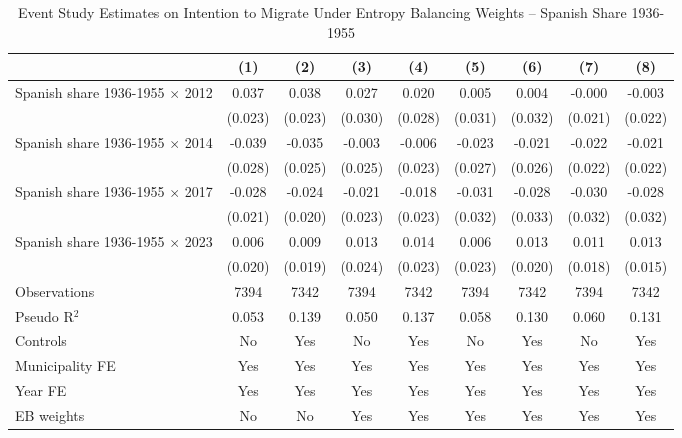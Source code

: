 \begin{table}[!h]
\centering
\renewcommand{\arraystretch}{1.25}
\setlength{\tabcolsep}{3pt}
\caption{Event Study Estimates on Intention to Migrate Under Entropy Balancing Weights -- Spanish Share 1936-1955}
\begin{tabular}{lcccccccc}
\hline
 & (1) & (2) & (3) & (4) & (5) & (6) & (7) & (8) \\
\hline
Spanish share 1936-1955 $\times$ 2012 & 0.037 & 0.038 & 0.027 & 0.020 & 0.005 & 0.004 & -0.000 & -0.003 \\
 & (0.023) & (0.023) & (0.030) & (0.028) & (0.031) & (0.032) & (0.021) & (0.022) \\
Spanish share 1936-1955 $\times$ 2014 & -0.039 & -0.035 & -0.003 & -0.006 & -0.023 & -0.021 & -0.022 & -0.021 \\
 & (0.028) & (0.025) & (0.025) & (0.023) & (0.027) & (0.026) & (0.022) & (0.022) \\
Spanish share 1936-1955 $\times$ 2017 & -0.028 & -0.024 & -0.021 & -0.018 & -0.031 & -0.028 & -0.030 & -0.028 \\
 & (0.021) & (0.020) & (0.023) & (0.023) & (0.032) & (0.033) & (0.032) & (0.032) \\
Spanish share 1936-1955 $\times$ 2023 & 0.006 & 0.009 & 0.013 & 0.014 & 0.006 & 0.013 & 0.011 & 0.013 \\
 & (0.020) & (0.019) & (0.024) & (0.023) & (0.023) & (0.020) & (0.018) & (0.015) \\
\addlinespace
Observations & 7394 & 7342 & 7394 & 7342 & 7394 & 7342 & 7394 & 7342 \\
Pseudo R$^2$ & 0.053 & 0.139 & 0.050 & 0.137 & 0.058 & 0.130 & 0.060 & 0.131 \\
Controls & No & Yes & No & Yes & No & Yes & No & Yes \\
Municipality FE & Yes & Yes & Yes & Yes & Yes & Yes & Yes & Yes \\
Year FE & Yes & Yes & Yes & Yes & Yes & Yes & Yes & Yes \\
EB weights & No & No & Yes & Yes & Yes & Yes & Yes & Yes \\
\hline
\end{tabular}
\vspace{0.4em}
\captionsetup{justification=justified, singlelinecheck=false}

\end{table}
